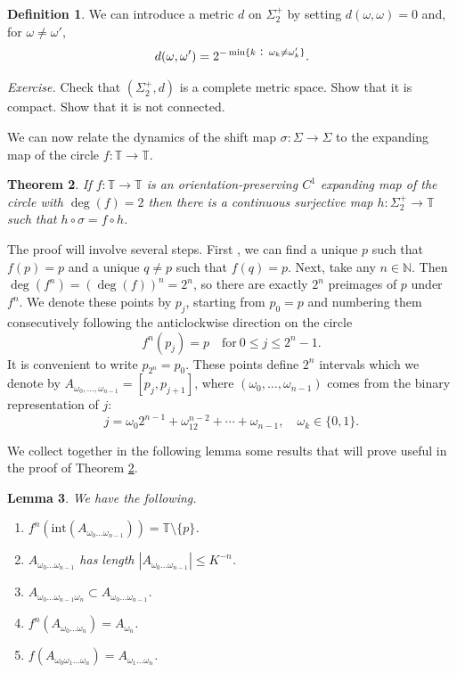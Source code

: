 \documentclass[12pt]{article}
\newtheorem{theorem}{Theorem}[section]
\newtheorem{lemma}[theorem]{Lemma}
\theoremstyle{definition}
\newtheorem{definition}[theorem]{Definition}
\theoremstyle{remark}
\begin{document}
\begin{definition}
We can introduce a metric $d$ on $\Sigma_2^+$ by setting $d(\omega,\omega)=0$ and,
for $\omega \ne \omega'$,
\[
d(\omega,\omega') = 2^{-\min\{k \hbox{ : } \omega_k \ne \omega_k'\}}.
\] 
\end{definition}

\medskip
\noindent
{\it Exercise.} Check that $(\Sigma_2^+,d)$ is a complete metric space. Show that it is compact. Show that it is not connected.

\medskip
We can now relate the dynamics of the shift map $\sigma :\Sigma \to \Sigma$ to the expanding map of the
circle $f : \mathbb T \to \mathbb T$.

\begin{theorem} \label{sym_dyn_deg2_exp_map}
If $f : \mathbb T \to \mathbb T$ is an orientation-preserving $C^1$ expanding map of the circle with
$\deg(f) = 2$ then there is a continuous surjective map $h : \Sigma_2^+ \to \mathbb T$ such that $h \circ \sigma
=f \circ h$.
\end{theorem}

The proof will involve several steps. 
First , we can find a unique $p$ such that $f(p)=p$ and a unique $q \ne p$ such that $f(q)=p$.
Next, take any $n \in \mathbb N$. Then $\deg(f^n) = (\deg(f))^n = 2^n$, so there are exactly $2^n$ preimages of $p$
under $f^n$. We denote these points by $p_j$, starting from $p_0 = p$ and numbering them consecutively
following the anticlockwise direction on the circle
\[
f^n(p_j) = p \quad \text{for} \ 0 \le j \le2^n -1.
\]
It is convenient to write $p_{2^n} = p_0$. These points define $2^n$ intervals which we denote by
$A_{\omega_0,\ldots,\omega_{n-1}} = [p_j,p_{j+1}]$, 
where $(\omega_0,\ldots,\omega_{n-1})$ comes from the binary representation of $j$:
\[
j = \omega_0 2^{n-1} + \omega_12^{n-2} + \cdots + \omega_{n-1}, \quad \omega_k \in \{0,1\}.
\]


We collect together in the following lemma some results that will prove useful in the proof of Theorem 
\ref{sym_dyn_deg2_exp_map}.

\begin{lemma}
We have the following.
\begin{enumerate}
\item[(1)]
$f^n(\mathrm{int}(A_{\omega_0\ldots \omega_{n-1}})) = \mathbb T \setminus \{p\}$.
\item[(2)]
$A_{\omega_0\ldots \omega_{n-1}}$ has length
$|A_{\omega_0\ldots \omega_{n-1}}| \le K^{-n}$.
\item[(3)]
$A_{\omega_0\ldots \omega_{n-1}\omega_n} \subset A_{\omega_0\ldots \omega_{n-1}}$.
\item[(4)]
$f^n(A_{\omega_0\ldots \omega_{n}}) = A_{\omega_n}$.
\item[(5)]
$f(A_{\omega_0 \omega_1 \ldots \omega_{n}}) =A_{\omega_1\ldots \omega_{n}}$.
\end{enumerate}
\end{lemma}
\end{document}
